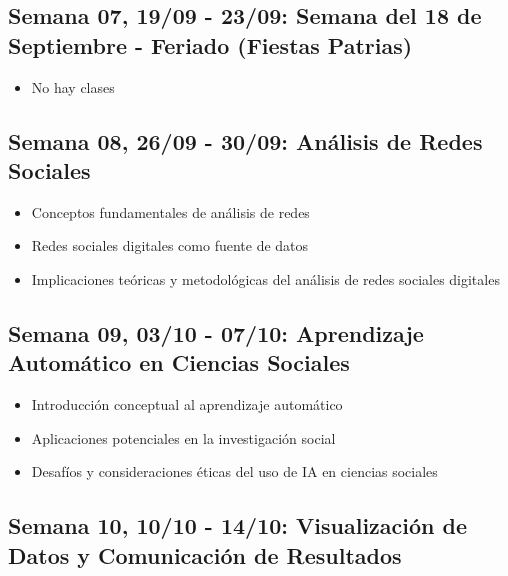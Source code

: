 \documentclass[11pt,letter,]{article}
\providecommand{\tightlist}{%
  \setlength{\itemsep}{0pt}\setlength{\parskip}{0pt}}
\begin{document}
\hypertarget{semana-07-1909---2309-semana-del-18-de-septiembre---feriado-fiestas-patrias}{%
\subsection{Semana 07, 19/09 - 23/09: Semana del 18 de Septiembre -
Feriado (Fiestas
Patrias)}\label{semana-07-1909---2309-semana-del-18-de-septiembre---feriado-fiestas-patrias}}

\begin{itemize}
\tightlist
\item
  No hay clases
\end{itemize}

\hypertarget{semana-08-2609---3009-anuxe1lisis-de-redes-sociales}{%
\subsection{Semana 08, 26/09 - 30/09: Análisis de Redes
Sociales}\label{semana-08-2609---3009-anuxe1lisis-de-redes-sociales}}

\begin{itemize}
\tightlist
\item
  Conceptos fundamentales de análisis de redes
\item
  Redes sociales digitales como fuente de datos
\item
  Implicaciones teóricas y metodológicas del análisis de redes sociales
  digitales
\end{itemize}

\hypertarget{semana-09-0310---0710-aprendizaje-automuxe1tico-en-ciencias-sociales}{%
\subsection{Semana 09, 03/10 - 07/10: Aprendizaje Automático en Ciencias
Sociales}\label{semana-09-0310---0710-aprendizaje-automuxe1tico-en-ciencias-sociales}}

\begin{itemize}
\tightlist
\item
  Introducción conceptual al aprendizaje automático
\item
  Aplicaciones potenciales en la investigación social
\item
  Desafíos y consideraciones éticas del uso de IA en ciencias sociales
\end{itemize}

\hypertarget{semana-10-1010---1410-visualizaciuxf3n-de-datos-y-comunicaciuxf3n-de-resultados}{%
\subsection{Semana 10, 10/10 - 14/10: Visualización de Datos y
Comunicación de
Resultados}\label{semana-10-1010---1410-visualizaciuxf3n-de-datos-y-comunicaciuxf3n-de-resultados}}
\end{document}
